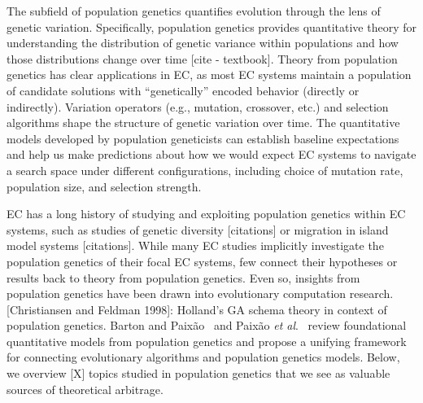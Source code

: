 
The subfield of population genetics quantifies evolution through the lens of genetic variation.
Specifically, population genetics provides quantitative theory for understanding the distribution of genetic variance within populations and how those distributions change over time [cite - textbook].
Theory from population genetics has clear applications in EC, as most EC systems maintain a population of candidate solutions with ``genetically'' encoded behavior (directly or indirectly).
Variation operators (e.g., mutation, crossover, etc.) and selection algorithms shape the structure of genetic variation over time.
The quantitative models developed by population geneticists can establish baseline expectations and help us make predictions about how we would expect EC systems to navigate a search space under different configurations, including choice of mutation rate, population size, and selection strength.

EC has a long history of studying and exploiting population genetics within EC systems, such as studies of genetic diversity [citations] or migration in island model systems [citations].
While many EC studies implicitly investigate the population genetics of their focal EC systems, few connect their hypotheses or results back to theory from population genetics.
Even so, insights from population genetics have been drawn into evolutionary computation research.
[Christiansen and Feldman 1998]: Holland's GA schema theory in context of  population genetics.
Barton and Paix\~{a}o~\citep{barton2013can} and Paix\~{a}o \textit{et al}.~\citep{paixao2015toward} review foundational quantitative models from population genetics and propose a unifying framework for connecting evolutionary algorithms and population genetics models.
Below, we overview [X] topics studied in population genetics that we see as valuable sources of theoretical arbitrage.

